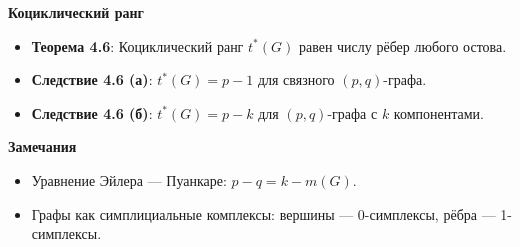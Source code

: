 \noindent\textbf{Коциклический ранг}
\begin{itemize}
    \item \textbf{Теорема 4.6}: Коциклический ранг $t^*(G)$ равен числу рёбер любого остова.
    \item \textbf{Следствие 4.6 (а)}: $t^*(G) = p - 1$ для связного $(p, q)$-графа.
    \item \textbf{Следствие 4.6 (б)}: $t^*(G) = p - k$ для $(p, q)$-графа с $k$ компонентами.
\end{itemize}

\noindent\textbf{Замечания}
\begin{itemize}
    \item Уравнение Эйлера — Пуанкаре: $p - q = k - m(G)$.
    \item Графы как симплициальные комплексы: вершины — 0-симплексы, рёбра — 1-симплексы.
\end{itemize}